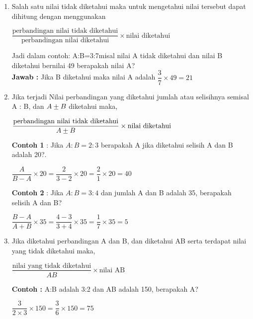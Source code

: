 		\begin{enumerate}
			\item Salah satu nilai tidak diketahui maka untuk mengetahui nilai tersebut dapat dihitung dengan menggunakan
			\begin{center}
				$\dfrac{\text{perbandingan nilai tidak diketahui}}{\text{perbandingan nilai diketahui}}\times \text{nilai diketahui}$
			\end{center} 
			Jadi dalam contoh: A:B=3:7misal nilai A tidak diketahui dan nilai B diketahui bernilai 49 berapakah nilai A? \\
			\textbf{Jawab :} Jika B diketahui maka nilai A adalah $\dfrac{3}{7}\times 49=21$
			\item Jika terjadi Nilai perbandingan yang diketahui jumlah atau selisihnya semisal A : B, dan $A\mypm B$ diketahui maka,
			\begin{center}
				$\dfrac{\text{perbandingan nilai tidak diketahui}}{A\mypm B}\times \text{nilai diketahui}$
							\end{center}
			\textbf{Contoh 1} : Jika $A:B=2:3$ berapakah A jika diketahui selisih A dan B adalah 20?. \\
			\begin{center}
				$\dfrac{A}{B-A} \times 20=\dfrac{2}{3-2}\times 20=\dfrac{2}{1}\times 20=40$
			\end{center}
			\textbf{Contoh 2} : Jika $A:B=3:4$ dan jumlah A dan B adalah 35, berapakah selisih A dan B? 
			\begin{center}
				$\dfrac{B-A}{A+B} \times 35=\dfrac{4-3}{3+4}\times 35=\dfrac{1}{7}\times 35=5$
			\end{center}
			\item Jika diketahui perbandingan A dan B, dan diketahui AB serta terdapat nilai yang tidak diketahui maka, 
			\begin{center}
				$\dfrac{\text{nilai yang tidak diketahui}}{AB}\times \text{nilai AB}$
			\end{center}
			\textbf{Contoh :} A:B adalah 3:2 dan AB adalah 150, berapakah A?
			\begin{center}
				$\dfrac{3}{2\times 3}\times 150=\dfrac{3}{6}\times 150=75$
			\end{center}
		
		
		
		
		
		
			\end{enumerate}
			
			
			